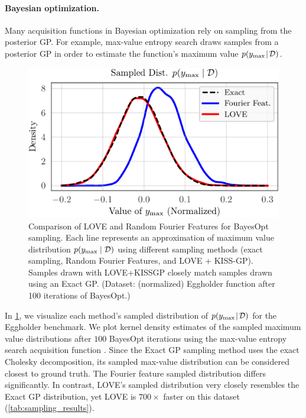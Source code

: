 \paragraph{Bayesian optimization.}
Many acquisition functions in Bayesian optimization rely on sampling from the posterior GP.
For example, max-value entropy search \cite{wang2017max} draws samples from a posterior GP in order to estimate the function's maximum value $p(y_\text{max} \! \mid \! \mathcal D)$.
%
\begin{figure}[t!]
  \centering
  \includegraphics[width=0.70\columnwidth]{figures/love_sampling_comparison.pdf}
  \caption[Comparison of LOVE and Random Fourier Features for BayesOpt sampling.]{
    Comparison of LOVE and Random Fourier Features for BayesOpt sampling.
    Each line represents an approximation of maximum value distribution $p(y_\text{max} \mid \mathcal D)$ using different sampling methods (exact sampling, Random Fourier Features, and LOVE + KISS-GP).
    Samples drawn with LOVE+KISSGP closely match samples drawn using an Exact GP.
    (Dataset: (normalized) Eggholder function after 100 iterations of BayesOpt.)
    \label{fig:love_sampling_comparison}
  }
\end{figure}
%
In \cref{fig:love_sampling_comparison}, we visualize each method's sampled distribution of $p(y_\text{max} \! \mid \! \mathcal D)$ for the Eggholder benchmark.
We plot kernel density estimates of the sampled maximum value distributions after $100$ BayesOpt iterations using the max-value entropy search acquisition function \citep{wang2017max}.
Since the Exact GP sampling method uses the exact Cholesky decomposition, its sampled max-value distribution can be considered closest to ground truth.
The Fourier feature sampled distribution differs significantly.
In contrast, LOVE{}'s sampled distribution very closely resembles the Exact GP distribution, yet
LOVE{} is $700 \times$ faster on this dataset (\cref{tab:sampling_results}).
